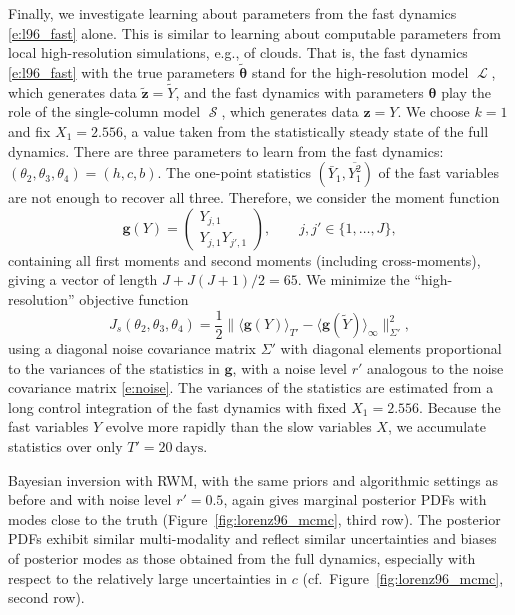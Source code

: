 \documentclass[draft]{agujournal}
\renewcommand{\vec}[1]{\boldsymbol{{#1}}}
\newcommand{\cL}{\mathop{\mathcal{L}}}
\newcommand{\cS}{\mathop{\mathcal{S}}}
\begin{document}
Finally, we investigate learning about parameters from the fast dynamics \eqref{e:l96_fast} alone. This is similar to learning about computable parameters from local high-resolution simulations, e.g., of clouds. That is, the fast dynamics \eqref{e:l96_fast} with the true parameters $\vec{\tilde\theta}$ stand for the high-resolution model $\cL$, which generates data $\vec{\tilde z} = \tilde Y$, and the fast dynamics with parameters $\vec{\theta}$ play the role of the single-column model $\cS$, which generates data $\vec{z} = Y$. We choose $k=1$ and fix $X_1=2.556$, a value taken from the statistically steady state of the full dynamics. There are three parameters to learn from the fast dynamics: $(\theta_2, \theta_3, \theta_4) = (h,c,b)$. The one-point statistics $(\bar Y_1,\overline{Y_1^2})$ of the fast variables are not enough to recover all three. Therefore, we consider the moment function 
\begin{equation}
\vec{g}(Y) = \left( 
\begin{array}{c} 
Y_{j,1}\\
Y_{j,1}Y_{j',1}
\end{array}
\right), \qquad j, j' \in \{1, \dots, J\},
\end{equation}
containing all first moments and second moments (including cross-moments), giving a vector of length  $J+J(J+1)/2=65$. We minimize the ``high-resolution'' objective function 
\begin{equation}\label{e:obj_o2}
J_s(\theta_2, \theta_3, \theta_4)=\frac12\| \langle \vec{g}(Y)  \rangle_{T'} - \langle \vec{g}(\tilde Y)
\rangle_{\infty} \|_{\Sigma'}^2,
\end{equation}
using a diagonal noise covariance matrix $\Sigma'$ with diagonal elements proportional to the variances of the statistics in $\vec{g}$, with a noise level $r'$  analogous to the noise covariance matrix \eqref{e:noise}. The variances of the statistics are estimated from a long control integration of the fast dynamics with fixed $X_1 = 2.556$. Because the fast variables $Y$ evolve more rapidly than the slow variables $X$, we accumulate statistics over only $T'=20~\mathrm{days}$. 

Bayesian inversion with RWM, with the same priors and algorithmic settings as before and with noise level $r'=0.5$, again gives marginal posterior PDFs with modes close to the truth (Figure~\ref{fig:lorenz96_mcmc}, third row). The posterior PDFs exhibit similar multi-modality and reflect similar uncertainties and biases of posterior modes as those obtained from the full dynamics, especially with respect to the relatively large uncertainties in $c$ (cf.\ Figure~\ref{fig:lorenz96_mcmc}, second row). 
\end{document}
